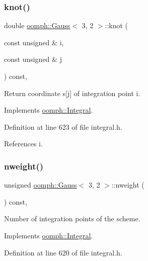 \subsubsection{\texorpdfstring{knot()}{knot()}}
{\footnotesize\ttfamily double \hyperlink{classoomph_1_1Gauss}{oomph\+::\+Gauss}$<$ 3, 2 $>$\+::knot (\begin{DoxyParamCaption}\item[{const unsigned \&}]{i,  }\item[{const unsigned \&}]{j }\end{DoxyParamCaption}) const\hspace{0.3cm}{\ttfamily [inline]}, {\ttfamily [virtual]}}



Return coordinate s\mbox{[}j\mbox{]} of integration point i. 



Implements \hyperlink{classoomph_1_1Integral_a1a2122f99a87c18649bafdd9ed739758}{oomph\+::\+Integral}.



Definition at line 623 of file integral.\+h.



References i.

\mbox{\label{classoomph_1_1Gauss_3_013_00_012_01_4_a276a6a871b775b3dd4f27b039816e367}} 
\subsubsection{\texorpdfstring{nweight()}{nweight()}}
{\footnotesize\ttfamily unsigned \hyperlink{classoomph_1_1Gauss}{oomph\+::\+Gauss}$<$ 3, 2 $>$\+::nweight (\begin{DoxyParamCaption}{ }\end{DoxyParamCaption}) const\hspace{0.3cm}{\ttfamily [inline]}, {\ttfamily [virtual]}}



Number of integration points of the scheme. 



Implements \hyperlink{classoomph_1_1Integral_a1a270de9d99a1fcf1d25a6c1017f65fa}{oomph\+::\+Integral}.



Definition at line 620 of file integral.\+h.

